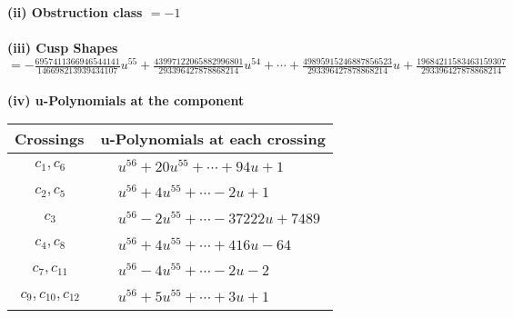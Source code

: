 \documentclass[1p]{elsarticle_modified}
\theoremstyle{definition}
\begin{document}
\flushleft \textbf{(ii) Obstruction class $= -1$}\\~\\
\flushleft \textbf{(iii) Cusp Shapes $= -\frac{6957411366946544141}{146698213939434107} u^{55}+\frac{43997122065882996801}{293396427878868214} u^{54}+\cdots+\frac{49895915246887856523}{293396427878868214} u+\frac{19684211583463159307}{293396427878868214}$}\\~\\
\newpage\renewcommand{\arraystretch}{1}
\flushleft \textbf{(iv) u-Polynomials at the component}\newline \\
\begin{tabular}{m{50pt}|m{274pt}}
Crossings & \hspace{64pt}u-Polynomials at each crossing \\
\hline $$\begin{aligned}c_{1},c_{6}\end{aligned}$$&$\begin{aligned}
&u^{56}+20 u^{55}+\cdots+94 u+1
\end{aligned}$\\
\hline $$\begin{aligned}c_{2},c_{5}\end{aligned}$$&$\begin{aligned}
&u^{56}+4 u^{55}+\cdots-2 u+1
\end{aligned}$\\
\hline $$\begin{aligned}c_{3}\end{aligned}$$&$\begin{aligned}
&u^{56}-2 u^{55}+\cdots-37222 u+7489
\end{aligned}$\\
\hline $$\begin{aligned}c_{4},c_{8}\end{aligned}$$&$\begin{aligned}
&u^{56}+4 u^{55}+\cdots+416 u-64
\end{aligned}$\\
\hline $$\begin{aligned}c_{7},c_{11}\end{aligned}$$&$\begin{aligned}
&u^{56}-4 u^{55}+\cdots-2 u-2
\end{aligned}$\\
\hline $$\begin{aligned}c_{9},c_{10},c_{12}\end{aligned}$$&$\begin{aligned}
&u^{56}+5 u^{55}+\cdots+3 u+1
\end{aligned}$\\
\hline
\end{tabular}\\~\\
\end{document}
